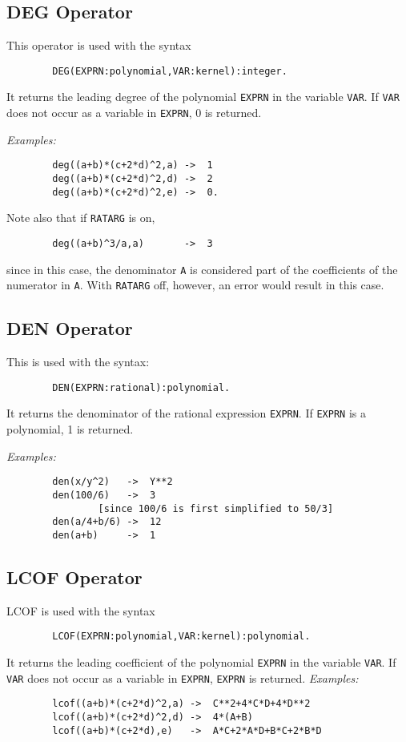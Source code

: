 \documentclass[11pt,letterpaper]{book}
\makeatletter
\newcommand{\underscore}{\_}
\newcommand{\ttindex}[1]{{\renewcommand{\_}{\protect\underscore}%
                          \index{#1@{\tt #1}}}}
\newcommand{\extendedmanual}[1]{#1}
\makeatother
\begin{document}
\subsection{DEG Operator}\ttindex{DEG}

This operator is used with the syntax
{\small\begin{verbatim}
        DEG(EXPRN:polynomial,VAR:kernel):integer.
\end{verbatim}}
It returns the leading degree of the polynomial {\tt EXPRN}
in the variable {\tt VAR}.  If {\tt VAR} does not occur as a variable in
{\tt EXPRN}, 0 is returned.

{\it Examples:}
{\small\begin{verbatim}
        deg((a+b)*(c+2*d)^2,a) ->  1
        deg((a+b)*(c+2*d)^2,d) ->  2
        deg((a+b)*(c+2*d)^2,e) ->  0.
\end{verbatim}}
Note also that if {\tt RATARG} is on,
{\small\begin{verbatim}
        deg((a+b)^3/a,a)       ->  3
\end{verbatim}}
since in this case, the denominator {\tt A} is considered part of the
coefficients of the numerator in {\tt A}.  With {\tt RATARG} off, however,
an error would result in this case.

\subsection{DEN Operator}\ttindex{DEN}

This is used with the syntax:
{\small\begin{verbatim}
        DEN(EXPRN:rational):polynomial.
\end{verbatim}}
It returns the denominator of the rational expression {\tt EXPRN}.  If
{\tt EXPRN} is a polynomial, 1 is returned.

{\it Examples:}
{\small\begin{verbatim}
        den(x/y^2)   ->  Y**2
        den(100/6)   ->  3
                [since 100/6 is first simplified to 50/3]
        den(a/4+b/6) ->  12
        den(a+b)     ->  1
\end{verbatim}}

\subsection{LCOF Operator}\ttindex{LCOF}

LCOF is used with the syntax
{\small\begin{verbatim}
        LCOF(EXPRN:polynomial,VAR:kernel):polynomial.
\end{verbatim}}
It returns the leading coefficient of the
polynomial {\tt EXPRN} in the variable {\tt VAR}.  If {\tt VAR} does not
occur as a variable in {\tt EXPRN}, {\tt EXPRN} is returned.
\extendedmanual{\newpage}
{\it Examples:}
{\small\begin{verbatim}
        lcof((a+b)*(c+2*d)^2,a) ->  C**2+4*C*D+4*D**2
        lcof((a+b)*(c+2*d)^2,d) ->  4*(A+B)
        lcof((a+b)*(c+2*d),e)   ->  A*C+2*A*D+B*C+2*B*D
\end{verbatim}}
\end{document}
